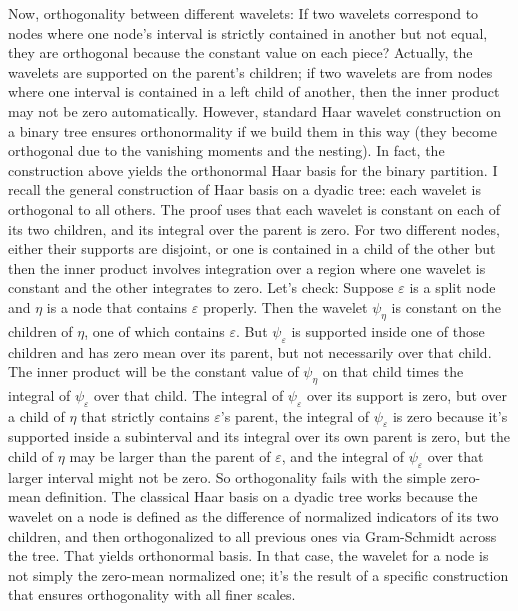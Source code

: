 \documentclass[11pt,a4paper]{article}
\begin{document}
Now, orthogonality between different wavelets: If two wavelets correspond to nodes where one node's interval is strictly contained in another but not equal, they are orthogonal because the constant value on each piece? Actually, the wavelets are supported on the parent's children; if two wavelets are from nodes where one interval is contained in a left child of another, then the inner product may not be zero automatically. However, standard Haar wavelet construction on a binary tree ensures orthonormality if we build them in this way (they become orthogonal due to the vanishing moments and the nesting). In fact, the construction above yields the orthonormal Haar basis for the binary partition. I recall the general construction of Haar basis on a dyadic tree: each wavelet is orthogonal to all others. The proof uses that each wavelet is constant on each of its two children, and its integral over the parent is zero. For two different nodes, either their supports are disjoint, or one is contained in a child of the other but then the inner product involves integration over a region where one wavelet is constant and the other integrates to zero. Let's check: Suppose \(\varepsilon\) is a split node and \(\eta\) is a node that contains \(\varepsilon\) properly. Then the wavelet \(\psi_\eta\) is constant on the children of \(\eta\), one of which contains \(\varepsilon\). But \(\psi_\varepsilon\) is supported inside one of those children and has zero mean over its parent, but not necessarily over that child. The inner product will be the constant value of \(\psi_\eta\) on that child times the integral of \(\psi_\varepsilon\) over that child. The integral of \(\psi_\varepsilon\) over its support is zero, but over a child of \(\eta\) that strictly contains \(\varepsilon\)'s parent, the integral of \(\psi_\varepsilon\) is zero because it's supported inside a subinterval and its integral over its own parent is zero, but the child of \(\eta\) may be larger than the parent of \(\varepsilon\), and the integral of \(\psi_\varepsilon\) over that larger interval might not be zero. So orthogonality fails with the simple zero-mean definition. The classical Haar basis on a dyadic tree works because the wavelet on a node is defined as the difference of normalized indicators of its two children, and then orthogonalized to all previous ones via Gram-Schmidt across the tree. That yields orthonormal basis. In that case, the wavelet for a node is not simply the zero-mean normalized one; it's the result of a specific construction that ensures orthogonality with all finer scales. 
\end{document}
